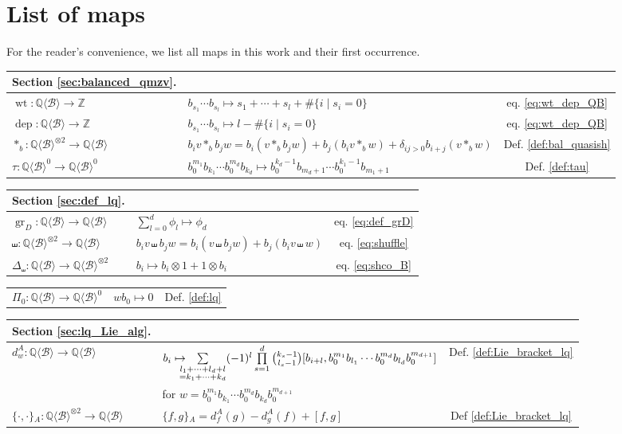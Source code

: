 \documentclass[12pt,reqno]{amsart}
\numberwithin{equation}{section}
\theoremstyle{definition}
\newcommand{\QQ}{\mathbb{Q}}
\newcommand{\grD}{\operatorname{gr}_D}
\newcommand{\wt}{\operatorname{wt}}
\newcommand{\dep}{\operatorname{dep}}
\newcommand{\B}{\mathcal{B}}
\newcommand{\QB}{\QQ\langle \B\rangle}
\newcommand{\ari}[2]{\{#1,#2\}\!_A}
\newcommand{\der}[1]{d_{#1}^A}
\newcommand{\shco}{\Delta_{\shuffle}}
\newcommand{\pizero}{\Pi_0}
\begin{document}
\section{List of maps}

For the reader's convenience, we list all maps in this work and their first occurrence.

\renewcommand{\arraystretch}{1.7}
\begin{table}[H]
\begin{tabular}{p{4.4cm}p{9.5cm}c}
\textbf{Section \ref{sec:balanced_qmzv}.} & & \\ \hline
$\wt:\QB\to \mathbb{Z}$ & $b_{s_1}\cdots b_{s_l}\mapsto s_1+\cdots+s_l+\#\{i\mid s_i=0\}$ & eq. \eqref{eq:wt_dep_QB}\\
$\dep:\QB\to\mathbb{Z}$ & $b_{s_1}\cdots b_{s_l}\mapsto l-\#\{i\mid s_i=0\}$ & eq. \eqref{eq:wt_dep_QB}\\
$\ast_b:\QB^{\otimes2}\to\QB$ & $	b_iv\ast_b b_jw=b_i(v\ast_b b_jw)+b_j(b_iv\ast_b w)+\delta_{ij>0} b_{i+j}(v\ast_b w)$ & Def. \ref{def:bal_quasish}\\
$\tau:\QB^0\to\QB^0$ & $b_0^{m_1}b_{k_1}\cdots b_0^{m_d}b_{k_d} \mapsto b_0^{k_d-1}b_{m_d+1}\cdots b_0^{k_1-1}b_{m_1+1}$ & Def. \ref{def:tau} 
\end{tabular} 
\end{table}
\begin{table}[H]
\begin{tabular}{p{4.4cm}p{9.5cm}c}
\textbf{Section \ref{sec:def_lq}.} & & \\ \hline
$\grD:\QB\to \QB$ & $\sum\limits_{l=0}^d \phi_l\mapsto\phi_d$ & eq. \eqref{eq:def_grD} \\
$\shuffle:\QB^{\otimes2}\to\QB$ & $b_iv\shuffle b_j w= b_i(v\shuffle b_j w)+b_j(b_iv\shuffle w)$ & eq. \eqref{eq:shuffle}\\
$\shco:\QB\to \QB^{\otimes2}$ & $b_i\mapsto b_i\otimes 1+1\otimes b_i$ & eq. \eqref{eq:shco_B} 
\end{tabular} 
\end{table}
\begin{table}[H]
\begin{tabular}{p{4.4cm}p{9.5cm}c}
$\pizero:\QB\to \QB^0$ & $ wb_0\mapsto 0$ & Def. \ref{def:lq} \\
\end{tabular} 
\end{table}
\begin{table}[H]
\begin{tabular}{p{4.4cm}p{9.5cm}c}
\textbf{Section \ref{sec:lq_Lie_alg}.} & & \\ \hline
$\der{w}:\QB\to \QB$ & $b_i\mapsto\hspace{-0.3cm}\sum\limits_{\substack{l_1+\cdots+l_d+l \\=k_1+\cdots+k_d}}(-1)^l\prod\limits_{s=1}^d\binom{k_s-1}{l_s-1}[b_{i+l},b_0^{m_1}b_{l_1}\cdots b_0^{m_d}b_{l_d}b_0^{m_{d+1}}]$ & Def. \ref{def:Lie_bracket_lq} \\
& for $w=b_0^{m_1}b_{k_1}\cdots b_0^{m_d}b_{k_d}b_0^{m_{d+1}}$ & \\
$\ari{\cdot}{\cdot}:\QB^{\otimes2}\to\QB$ & $\ari{f}{g}= \der{f}(g)-\der{g}(f)+[f,g]$ & Def \ref{def:Lie_bracket_lq} \\
\end{tabular} 
\end{table}
\end{document}
